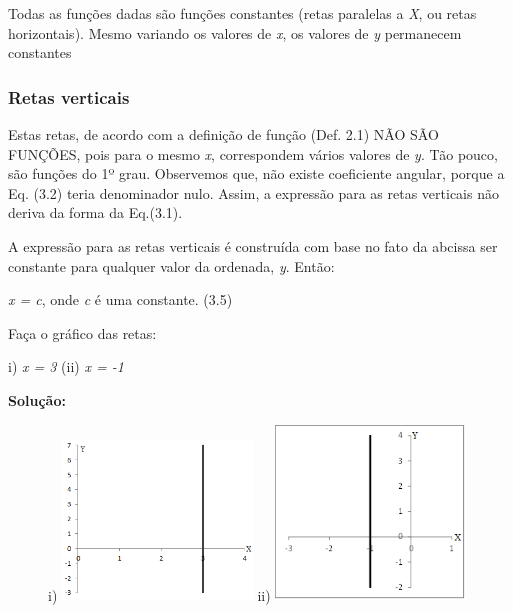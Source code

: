 Todas as funções dadas são funções constantes (retas paralelas a \textit{X}, ou retas horizontais). Mesmo variando os valores de \textit{x}, os valores de \textit{y} permanecem constantes \qedsymbol{} 

\subsubsection{Retas verticais}

Estas retas, de acordo com a definição de função (Def. 2.1) NÃO SÃO FUNÇÕES, pois para o mesmo \textit{x}, correspondem vários valores de \textit{y}. Tão pouco, são funções do 1º grau. Observemos que, não existe coeficiente angular, porque a Eq. (3.2) teria denominador nulo. Assim, a expressão para as retas verticais não deriva da forma da Eq.(3.1). 

A expressão para as retas verticais é construída com base no fato da abcissa ser constante para qualquer valor da ordenada, \textit{y}. Então:

\begin{caixa}
\textit{x = c}, onde  \textit{c} é uma constante. \tab (3.5)
\end{caixa}

\begin{texemplo}
Faça o gráfico das retas: 

i) \textit{x = 3} \qquad (ii) \textit{x = -1}

\textbf{Solução:}

\begin{figure}[H]
	i) \includegraphics[width=0.45\textwidth]{capitulos/funcao_do_primeiro_grau/media/image18.png} 
	ii) \includegraphics[width=0.45\textwidth]{capitulos/funcao_do_primeiro_grau/media/image19.png}
\end{figure}
\end{texemplo}

